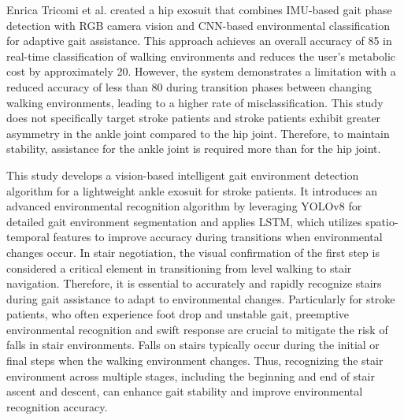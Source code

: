 \documentclass[journal,article,submit,pdftex,moreauthors]{Definitions/mdpi}
\begin{document}
Enrica Tricomi et al. created a hip exosuit that combines IMU-based gait phase detection with RGB camera vision and CNN-based environmental classification for adaptive gait assistance. This approach achieves an overall accuracy of 85 in real-time classification of walking environments and reduces the user's metabolic cost by approximately 20. However, the system demonstrates a limitation with a reduced accuracy of less than 80 during transition phases between changing walking environments, leading to a higher rate of misclassification. This study does not specifically target stroke patients and stroke patients exhibit greater asymmetry in the ankle joint compared to the hip joint. Therefore, to maintain stability, assistance for the ankle joint is required more than for the hip joint.

This study develops a vision-based intelligent gait environment detection algorithm for a lightweight ankle exosuit for stroke patients. It introduces an advanced environmental recognition algorithm by leveraging YOLOv8 for detailed gait environment segmentation and applies LSTM, which utilizes spatio-temporal features to improve accuracy during transitions when environmental changes occur.
In stair negotiation, the visual confirmation of the first step is considered a critical element in transitioning from level walking to stair navigation. Therefore, it is essential to accurately and rapidly recognize stairs during gait assistance to adapt to environmental changes. Particularly for stroke patients, who often experience foot drop and unstable gait, preemptive environmental recognition and swift response are crucial to mitigate the risk of falls in stair environments. Falls on stairs typically occur during the initial or final steps when the walking environment changes. Thus, recognizing the stair environment across multiple stages, including the beginning and end of stair ascent and descent, can enhance gait stability and improve environmental recognition accuracy.
\end{document}
